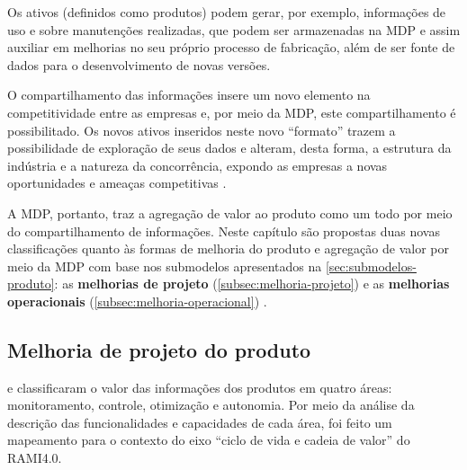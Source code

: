 
Os ativos (definidos como produtos) podem gerar, por exemplo, informações de uso e sobre manutenções realizadas, que podem ser armazenadas na MDP e assim auxiliar em melhorias no seu próprio processo de fabricação, além de ser fonte de dados para o desenvolvimento de novas versões.

O compartilhamento das informações insere um novo elemento na competitividade entre as empresas \cite{framling2013plm} e, por meio da MDP, este compartilhamento é possibilitado. Os novos ativos inseridos neste novo ``formato'' trazem a possibilidade de exploração de seus dados e alteram, desta forma, a estrutura da indústria e a natureza da concorrência, expondo as empresas a novas oportunidades e ameaças competitivas \cite{porter2014smartproducts}.

A MDP, portanto, traz a agregação de valor ao produto como um todo por meio do compartilhamento de informações. Neste capítulo são propostas duas novas classificações quanto às formas de melhoria do produto e agregação de valor por meio da MDP com base nos submodelos apresentados na \autoref{sec:submodelos-produto}: as \textbf{melhorias de projeto} (\autoref{subsec:melhoria-projeto}) e as \textbf{melhorias operacionais} (\autoref{subsec:melhoria-operacional}) .


\subsection{Melhoria de projeto do produto}
\label{subsec:melhoria-projeto}

 e  classificaram o valor das informações dos produtos em quatro áreas: monitoramento, controle, otimização e autonomia. Por meio da análise da descrição das funcionalidades e capacidades de cada área, foi feito um mapeamento para o contexto do eixo ``ciclo de vida e cadeia de valor'' do RAMI4.0.

